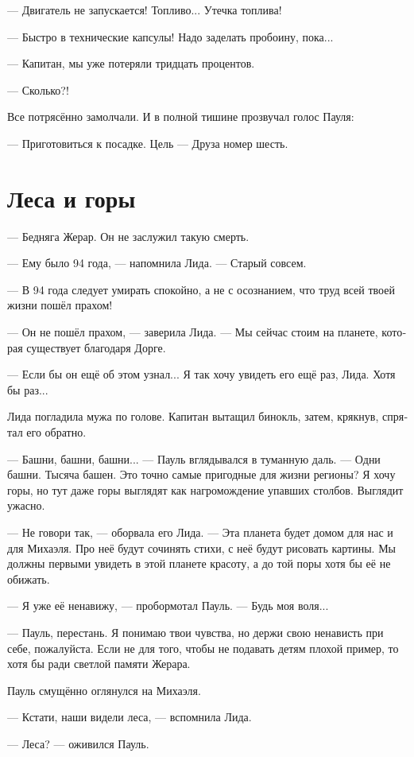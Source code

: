 \documentclass[a4paper,12pt,fleqn]{book}\usepackage{polyglossia}\setdefaultlanguage[babelshorthands=true]{russian}\setotherlanguage{english}\defaultfontfeatures{Ligatures=TeX,Mapping=tex-text}\usepackage{xcolor}\newcommand{\ml}[3]{#2}
\begin{document}
--- Двигатель не запускается!
Топливо...
Утечка топлива!

--- Быстро в технические капсулы!
Надо заделать пробоину, пока...

--- Капитан, мы уже потеряли тридцать процентов.

--- Сколько?!

Все потрясённо замолчали.
И в полной тишине прозвучал голос Пауля:

--- Приготовиться к посадке.
Цель --- Друза номер шесть.

\section{Леса и горы}

--- Бедняга Жерар.
Он не заслужил такую смерть.

--- Ему было 94 года, --- напомнила Лида.
--- Старый совсем.

--- В 94 года следует умирать спокойно, а не с осознанием, что труд всей твоей жизни пошёл прахом!

--- Он не пошёл прахом, --- заверила Лида.
--- Мы сейчас стоим на планете, которая существует благодаря Дорге.

--- Если бы он ещё об этом узнал...
Я так хочу увидеть его ещё раз, Лида.
Хотя бы раз...

Лида погладила мужа по голове.
Капитан вытащил бинокль, затем, крякнув, спрятал его обратно.

--- Башни, башни, башни... --- Пауль вглядывался в туманную даль.
--- Одни башни.
Тысяча башен.
Это точно самые пригодные для жизни регионы?
Я хочу горы, но тут даже горы выглядят как нагромождение упавших столбов.
Выглядит ужасно.

--- Не говори так, --- оборвала его Лида.
--- Эта планета будет домом для нас и для Михаэля.
Про неё будут сочинять стихи, с неё будут рисовать картины.
Мы должны первыми увидеть в этой планете красоту, а до той поры хотя бы её не обижать.

--- Я уже её ненавижу, --- пробормотал Пауль.
--- Будь моя воля...

--- Пауль, перестань.
Я понимаю твои чувства, но держи свою ненависть при себе, пожалуйста.
Если не для того, чтобы не подавать детям плохой пример, то хотя бы ради светлой памяти Жерара.

Пауль смущённо оглянулся на Михаэля.

--- Кстати, наши видели леса, --- вспомнила Лида.

--- Леса? --- оживился Пауль.
\end{document}
